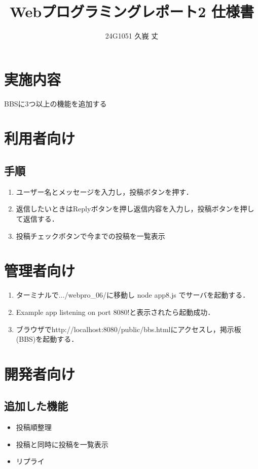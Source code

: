 \documentclass{jsarticle}
\title{Webプログラミングレポート2 仕様書}
\author{24G1051 久峩 丈}
\date{}
\begin{document}
\maketitle
\section*{実施内容}
BBSに3つ以上の機能を追加する

\section*{利用者向け}

\subsection*{手順}
\begin{enumerate}
\item ユーザー名とメッセージを入力し，投稿ボタンを押す．
\item 返信したいときはReplyボタンを押し返信内容を入力し，投稿ボタンを押して返信する．
\item 投稿チェックボタンで今までの投稿を一覧表示
\end{enumerate}


\section*{管理者向け}
\begin{enumerate}
\item ターミナルで$\ldots$/webpro\_06/に移動し node app8.js でサーバを起動する．
\item Example app listening on port 8080!と表示されたら起動成功．
\item ブラウザでhttp://localhost:8080/public/bbs.htmlにアクセスし，掲示板(BBS)を起動する．
\end{enumerate}

\section*{開発者向け}
\subsection*{追加した機能}
\begin{itemize}
    \item 投稿順整理
    \item 投稿と同時に投稿を一覧表示
    \item リプライ
\end{itemize}
\end{document}
